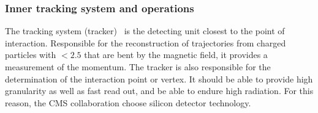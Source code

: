 \subsubsection{Inner tracking system and operations}
\label{sec:TRK}
The tracking system (tracker)~\cite{Chatrchyan:1704291} is the detecting unit closest to the point of interaction. Responsible for the reconstruction of  trajectories from charged particles with \abspsrap $<2.5$ that are bent by the magnetic field, it provides a measurement of the momentum. The tracker is also responsible for the determination of the interaction point or vertex. It should be able to provide high granularity as well as fast read out, and be able to endure high radiation. For this reason, the CMS collaboration choose silicon detector technology.


